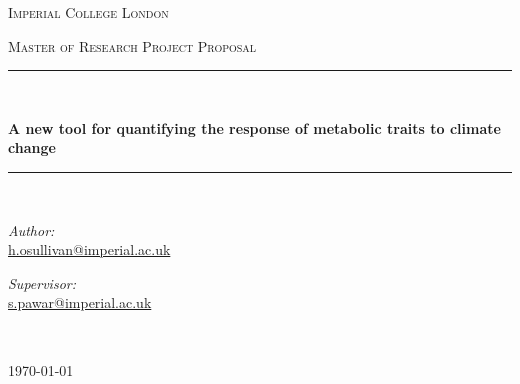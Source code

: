 \documentclass[
11pt, %
onehalfspacing, %
parskip, %
headsepline, %
]{article} %
\newcommand{\HRule}{\rule{\linewidth}{0.5mm}} %
\begin{document}
\date{} %
\begin{titlepage} %
\begin{center} %

\vspace*{.06\textheight}
{\scshape\LARGE Imperial College London\par}\vspace{1.5cm} %
\textsc{\Large Master of Research Project Proposal}\\[0.5cm] %

\HRule \\[0.4cm] %
{\huge \bfseries A new tool for quantifying the response of metabolic traits to climate change\par}\vspace{0.4cm} %
\HRule \\[1.5cm] %

\begin{minipage}[t]{0.4\textwidth}
\begin{flushleft} \large
\emph{Author:} \\
\href{mailto:h.osullivan@imperial.ac.uk}{h.osullivan@imperial.ac.uk}
\end{flushleft}
\end{minipage}
\begin{minipage}[t]{0.4\textwidth}
\begin{flushright} \large
\emph{Supervisor:} \\
\href{mailto:s.pawar@imperial.ac.uk}{s.pawar@imperial.ac.uk}
\end{flushright}
\end{minipage}\\[3cm]

\vfill

{\large \today}\\[4cm] %

\vfill
\end{center}
\end{titlepage}
\end{document}
